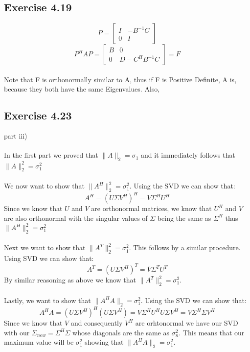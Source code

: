 \documentclass[letterpaper,12pt]{article}
\theoremstyle{definition}
\begin{document}
\subsection*{Exercise 4.19}
\[ P = \begin{bmatrix} 
I & -B^{-1}C\\
0 & I
\end{bmatrix}
\]
\[ P^HAP = \begin{bmatrix}
B & 0\\
0 & D - C^HB^{-1}C
\end{bmatrix} = F
\]\\
Note that F is orthonormally similar to A, thus if F is Positive Definite, A is, because they both have the same Eigenvalues. Also, 

\subsection*{Exercise 4.23}

part iii)\\ \\
In the first part we proved that $\|A\|_{2} = \sigma_{1}$ and it immediately follows that $\|A\|_{2}^{2} = \sigma_{1}^{2}$ \\ \\
We now want to show that $\|A^{H}\|_{2}^{2} = \sigma_{1}^{2}$. Using the SVD we can show that:\\
   \[ A^{H} = (U \Sigma V^{H})^{H} = V \Sigma^{H} U^{H} \]
   Since we know that $U$ and $V$ are orthonormal matrices, we know that $U^{H}$ and $V$ are also orthonormal with the singular values of $\Sigma$ being the same as $\Sigma^{H}$ thus $\|A^{H}\|_{2}^{2} = \sigma_{1}^{2}$ \\ \\
   Next we want to show that $\|A^{T}\|_{2}^{2} = \sigma_{1}^{2}$. This follows by a similar procedure. Using SVD we can show that: \\
   \[ A^{T} = (U \Sigma V^{H})^{T} = \bar{V} \Sigma^{T} U^{T} \]
   By similar reasoning as above we know that $\|A^{T}\|_{2}^{2} = \sigma_{1}^{2}$. \\ \\
   Lastly, we want to show that $\|A^{H}A\|_{2} = \sigma_{1}^{2}$. Using the SVD we can show that: \\
   \[ A^{H}A = (U\Sigma V^{H})^{H}(U\Sigma V^{H}) = V\Sigma^{H}U^{H} U\Sigma V^{H} = V\Sigma^{H}\Sigma V^{H} \]
   Since we know that $V$ and consequently $V^{H}$ are orhtonormal we have our SVD with our $\Sigma_{new} = \Sigma^{H}\Sigma$ whose diagonals are the same as $\sigma_{n}^{2}$. This means that our maximum value will be $\sigma_{1}^{2}$ showing that $\|A^{H}A\|_{2} = \sigma_{1}^{2}$.
\end{document}
